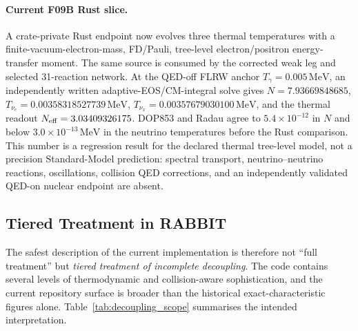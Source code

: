 \paragraph{Current F09B Rust slice.} A crate-private Rust endpoint now evolves
three thermal temperatures with a finite-vacuum-electron-mass, FD/Pauli,
tree-level electron/positron energy-transfer moment.  The same source is
consumed by the corrected weak leg and selected 31-reaction network.  At the
QED-off FLRW anchor $T_\gamma=0.005\,\mathrm{MeV}$, an independently written
adaptive-EOS/CM-integral solve gives
$N=7.93669848685$, $T_{\nu_e}=0.00358318527739\,\mathrm{MeV}$,
$T_{\nu_x}=0.00357679030100\,\mathrm{MeV}$, and the thermal readout
$N_{\rm eff}=3.03409326175$.  DOP853 and Radau agree to
$5.4\times10^{-12}$ in $N$ and below $3.0\times10^{-13}\,\mathrm{MeV}$ in
the neutrino temperatures before the Rust comparison.  This number is a
regression result for the declared thermal tree-level model, not a precision
Standard-Model prediction: spectral transport, neutrino--neutrino reactions,
oscillations, collision QED corrections, and an independently validated
QED-on nuclear endpoint are absent.

\subsection{Tiered Treatment in RABBIT}

The safest description of the current implementation is therefore not ``full treatment'' but \emph{tiered treatment of incomplete decoupling}.  The code contains several levels of thermodynamic and collision-aware sophistication, and the current repository surface is broader than the historical exact-characteristic figures alone.  Table~\ref{tab:decoupling_scope} summarises the intended interpretation.

